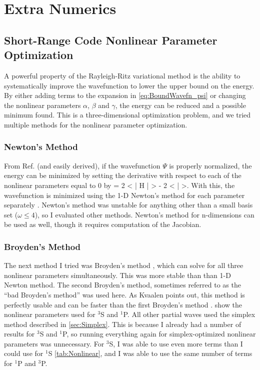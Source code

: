 \documentclass[Dissertation.tex]{subfiles}
\begin{document}
\chapter{Extra Numerics}
\label{chp:ExtraNumerics}


\section{Short-Range Code Nonlinear Parameter Optimization}
\label{sec:BoundOptimization}

A powerful property of the Rayleigh-Ritz variational method is the 
ability to systematically improve the wavefunction to lower the upper bound 
on the energy. By either adding terms to the expansion in
\cref{eq:BoundWavefn_psi} or changing the nonlinear parameters $\alpha$,
$\beta$ and $\gamma$, the energy can be reduced and a possible minimum
found. This is a three-dimensional optimization problem, and we tried 
multiple methods for the nonlinear parameter optimization.

\subsection{Newton's Method}
\label{sec:Newton}
From Ref. \cite{Yan1999} (and easily derived), if the wavefunction $\Psi$
is properly normalized, the energy can be minimized by setting the
derivative with respect to each of the nonlinear parameters equal to 0 by
\beq
{} = 2 \left< \Psi \Big| H \Big| \frac{\partial\Psi}{\partial \alpha} \right> - 2 \left< \Psi \Big| \frac{\partial\Psi}{\partial \alpha} \right>.
\label{eq:EnergyDerivativeNorm}
\eeq
With this, the wavefunction is minimized using the 1-D Newton's method for 
each parameter separately \cite{Sauer2006}. Newton's method was unstable for 
anything other than a small basis set ($\omega \leq 4$), so I evaluated other 
methods. Newton's method for n-dimensions can be used as well, though it 
requires computation of the Jacobian.

\subsection{Broyden's Method}
\label{sec:Broyden}

The next method I tried was Broyden's method \cite{Sauer2006}, which can 
solve for all three nonlinear parameters simultaneously. This was more stable 
than than 1-D Newton method. The second Broyden's method, sometimes referred 
to as the ``bad Broyden's method'' was used here. As Kvaalen points out, this 
method is perfectly usable and can be faster than the first Broyden's method 
\cite{Kvaalen1991}. 
show the nonlinear parameters used for $^3$S and $^1$P. All other partial waves
used the simplex method described in \cref{sec:Simplex}. This is because I
already had a number of results for $^3$S and $^1$P, so running everything
again for simplex-optimized nonlinear parameters was unnecessary. For $^3$S,
I was able to use even more terms than I could use for $^1$S \cref{tab:Nonlinear},
and I was able to use the same number of terms for $^1$P and $^3$P.
\end{document}
